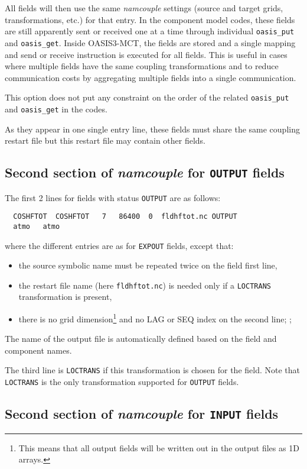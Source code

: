 All fields will then use the same
{\it namcouple} settings (source and target grids, transformations, etc.) for that entry. In the component model codes,
these fields are still apparently sent or received one at a
time through individual {\tt oasis\_put} and {\tt oasis\_get}. Inside OASIS3-MCT, the fields are stored and a single mapping
and send or receive instruction is executed for all fields. This is
useful in cases where multiple fields have the same coupling
transformations and to reduce communication costs by aggregating multiple 
fields into a single communication. 

This option does not put any constraint
on the order of the related {\tt oasis\_put} and {\tt oasis\_get} in the codes.

As they appear in one single entry line, these fields must share the same coupling restart file 
but this restart file may contain other fields.

\subsection{Second section of {\it namcouple} for {\tt OUTPUT} fields}
\label{subsubsec_secondOUTPUT}
The first 2 lines for fields with status {\tt OUTPUT} are as follows:
  \begin{verbatim}
  COSHFTOT  COSHFTOT   7   86400  0  fldhftot.nc OUTPUT 
  atmo   atmo 
\end{verbatim}
where the different entries are as for {\tt EXPOUT} fields, except
that:
\begin{itemize}
\item the source symbolic name must be repeated twice on the field
  first line,
\item the restart file name (here {\tt fldhftot.nc}) is needed only if
  a {\tt LOCTRANS} transformation is present,
\item there is no grid dimension\footnote{This means that all output
    fields will be written out in the output files as 1D arrays.} and no LAG or SEQ
  index on the second line; ;
\end{itemize}
The name of the output file is automatically defined based on the
field and component names.

The third line is {\tt LOCTRANS} if this transformation is chosen for
the field. Note that {\tt LOCTRANS} is the only transformation
supported for {\tt OUTPUT} fields.

\subsection{Second section of {\it namcouple} for {\tt INPUT} fields}
\label{subsubsec_secondINPUT}

